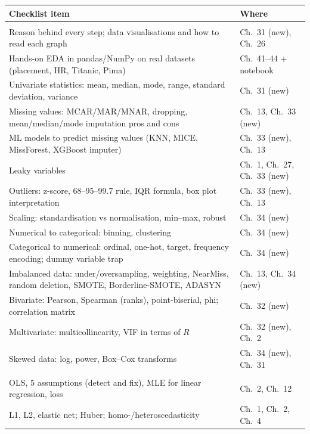 \begin{center}\footnotesize
\begin{tabularx}{\linewidth}{>{\raggedright\arraybackslash}X >{\raggedright\arraybackslash}p{4.6cm}}
\toprule
\textbf{Checklist item} & \textbf{Where}\\
\midrule
\multicolumn{2}{l}{\textbf{\color{accent}EDA}}\\
Reason behind every step; data visualisations and how to read each graph & Ch.\ 31 (new), Ch.\ 26\\
Hands-on EDA in pandas/NumPy on real datasets (placement, HR, Titanic, Pima) & Ch.\ 41--44 + notebook\\
Univariate statistics: mean, median, mode, range, standard deviation, variance & Ch.\ 31 (new)\\
Missing values: MCAR/MAR/MNAR, dropping, mean/median/mode imputation pros and cons & Ch.\ 13, Ch.\ 33 (new)\\
ML models to predict missing values (KNN, MICE, MissForest, XGBoost imputer) & Ch.\ 33 (new), Ch.\ 13\\
Leaky variables & Ch.\ 1, Ch.\ 27, Ch.\ 33 (new)\\
Outliers: z-score, 68--95--99.7 rule, IQR formula, box plot interpretation & Ch.\ 33 (new), Ch.\ 13\\
Scaling: standardisation vs normalisation, min--max, robust & Ch.\ 34 (new)\\
Numerical to categorical: binning, clustering & Ch.\ 34 (new)\\
Categorical to numerical: ordinal, one-hot, target, frequency encoding; dummy variable trap & Ch.\ 34 (new)\\
Imbalanced data: under/oversampling, weighting, NearMiss, random deletion, SMOTE, Borderline-SMOTE, ADASYN & Ch.\ 13, Ch.\ 34 (new)\\
Bivariate: Pearson, Spearman (ranks), point-biserial, phi; correlation matrix & Ch.\ 32 (new)\\
Multivariate: multicollinearity, VIF in terms of $R$ & Ch.\ 32 (new), Ch.\ 2\\
Skewed data: log, power, Box--Cox transforms & Ch.\ 34 (new), Ch.\ 31\\
\midrule
\multicolumn{2}{l}{\textbf{\color{accent}Basic ML}}\\
OLS, 5 assumptions (detect and fix), MLE for linear regression, loss & Ch.\ 2, Ch.\ 12\\
L1, L2, elastic net; Huber; homo-/heteroscedasticity & Ch.\ 1, Ch.\ 2, Ch.\ 4\\

\end{tabularx}
\end{center}
